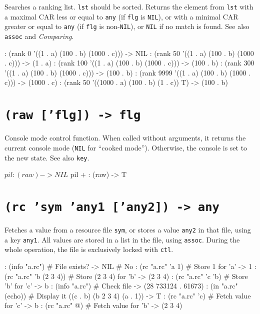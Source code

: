 Searches a ranking list. \texttt{lst} should be sorted. Returns the element
from \texttt{lst} with a maximal CAR less or equal to \texttt{any} (if \texttt{flg} is
\texttt{NIL}), or with a minimal CAR greater or equal to \texttt{any} (if \texttt{flg} is
non-\texttt{NIL}), or \texttt{NIL} if no match is found. See also \texttt{assoc} and
\emph{Comparing}.


\begin{wideverbatim}
: (rank 0 '((1 . a) (100 . b) (1000 . c)))
-> NIL
: (rank 50 '((1 . a) (100 . b) (1000 . c)))
-> (1 . a)
: (rank 100 '((1 . a) (100 . b) (1000 . c)))
-> (100 . b)
: (rank 300 '((1 . a) (100 . b) (1000 . c)))
-> (100 . b)
: (rank 9999 '((1 . a) (100 . b) (1000 . c)))
-> (1000 . c)
: (rank 50 '((1000 . a) (100 . b) (1 . c)) T)
-> (100 . b)
\end{wideverbatim}

 
\section*{\texttt{(raw ['flg]) -> flg}}
\label{sec:func-ref-R-(raw ['flg]) -> flg}


Console mode control function. When called without arguments, it returns
the current console mode (\texttt{NIL} for ``cooked mode''). Otherwise, the
console is set to the new state. See also \texttt{key}.


\begin{wideverbatim}
$ pil
: (raw)
-> NIL
$ pil +
: (raw)
-> T
\end{wideverbatim}

 
\section*{\texttt{(rc 'sym 'any1 ['any2]) -> any}}
\label{sec:func-ref-R-(rc 'sym 'any1 ['any2]) -> any}


Fetches a value from a resource file \texttt{sym}, or stores a value \texttt{any2} in
that file, using a key \texttt{any1}. All values are stored in a list in the
file, using \texttt{assoc}. During the whole operation, the file is exclusively
locked with \texttt{ctl}.


\begin{wideverbatim}
: (info "a.rc")               # File exists?
-> NIL                        # No
: (rc "a.rc" 'a 1)            # Store 1 for 'a'
-> 1
: (rc "a.rc" 'b (2 3 4))      # Store (2 3 4) for 'b'
-> (2 3 4)
: (rc "a.rc" 'c 'b)           # Store 'b' for 'c'
-> b
: (info "a.rc")               # Check file
-> (28 733124 . 61673)
: (in "a.rc" (echo))          # Display it
((c . b) (b 2 3 4) (a . 1))
-> T
: (rc "a.rc" 'c)              # Fetch value for 'c'
-> b
: (rc "a.rc" @)               # Fetch value for 'b'
-> (2 3 4)
\end{wideverbatim}

